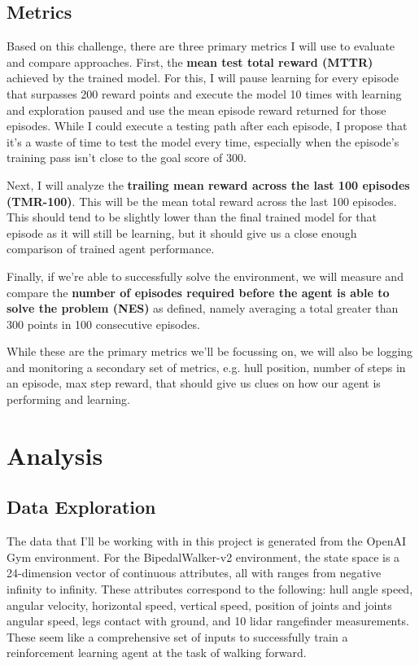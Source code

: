 \documentclass{article}
\begin{document}
\subsection{Metrics}
Based on this challenge, there are three primary metrics I will use to evaluate and compare approaches. First, the \textbf{mean test total reward (MTTR)} achieved by the trained model. For this, I will pause learning for every episode that surpasses 200 reward points and execute the model 10 times with learning and exploration paused and use the mean episode reward returned for those episodes. While I could execute a testing path after each episode, I propose that it's a waste of time to test the model every time, especially when the episode's training pass isn't close to the goal score of 300.

Next, I will analyze the \textbf{trailing mean reward across the last 100 episodes (TMR-100)}. This will be the mean total reward across the last 100 episodes. This should tend to be slightly lower than the final trained model for that episode as it will still be learning, but it should give us a close enough comparison of trained agent performance. 

Finally, if we're able to successfully solve the environment, we will measure and compare the \textbf{number of episodes required before the agent is able to solve the problem (NES)} as defined, namely averaging a total greater than 300 points in 100 consecutive episodes.

While these are the primary metrics we'll be focussing on, we will also be logging and monitoring a secondary set of metrics, e.g. hull position, number of steps in an episode, max step reward, that should give us clues on how our agent is performing and learning.


\section{Analysis}
\label{sec:analysis}

\subsection{Data Exploration}
The data that I'll be working with in this project is generated from the OpenAI Gym environment. For the BipedalWalker-v2 environment, the state space is a 24-dimension vector of continuous attributes, all with ranges from negative infinity to infinity. These attributes correspond to the following: hull angle speed, angular velocity, horizontal speed, vertical speed, position of joints and joints angular speed, legs contact with ground, and 10 lidar rangefinder measurements. These seem like a comprehensive set of inputs to successfully train a reinforcement learning agent at the task of walking forward.  
\end{document}
